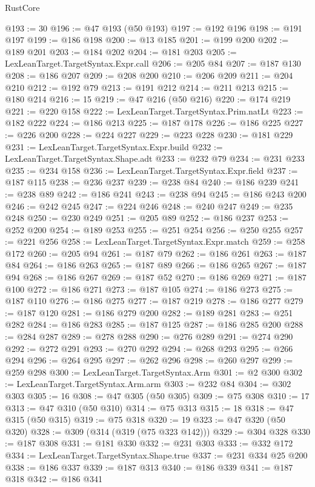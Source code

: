 \begin{lexlean}{RustCore}
\begin{coremodule}
@193 := 30
@196 := @47 @193 (@50 @193)
@197 := @192 @196
@198 := @191 @197
@199 := @186 @198
@200 := @13 @185
@201 := @199 @200
@202 := @189 @201
@203 := @184 @202
@204 := @181 @203
@205 := LexLeanTarget.TargetSyntax.Expr.call
@206 := @205 @84
@207 := @187 @130
@208 := @186 @207
@209 := @208 @200
@210 := @206 @209
@211 := @204 @210
@212 := @192 @79
@213 := @191 @212
@214 := @211 @213
@215 := @180 @214
@216 := 15
@219 := @47 @216 (@50 @216)
@220 := @174 @219
@221 := @220 @158
@222 := LexLeanTarget.TargetSyntax.Prim.natLt
@223 := @182 @222
@224 := @186 @213
@225 := @187 @178
@226 := @186 @225
@227 := @226 @200
@228 := @224 @227
@229 := @223 @228
@230 := @181 @229
@231 := LexLeanTarget.TargetSyntax.Expr.build
@232 := LexLeanTarget.TargetSyntax.Shape.adt
@233 := @232 @79
@234 := @231 @233
@235 := @234 @158
@236 := LexLeanTarget.TargetSyntax.Expr.field
@237 := @187 @115
@238 := @236 @237
@239 := @238 @84
@240 := @186 @239
@241 := @238 @89
@242 := @186 @241
@243 := @238 @94
@245 := @186 @243 @200
@246 := @242 @245
@247 := @224 @246
@248 := @240 @247
@249 := @235 @248
@250 := @230 @249
@251 := @205 @89
@252 := @186 @237
@253 := @252 @200
@254 := @189 @253
@255 := @251 @254
@256 := @250 @255
@257 := @221 @256
@258 := LexLeanTarget.TargetSyntax.Expr.match
@259 := @258 @172
@260 := @205 @94
@261 := @187 @79
@262 := @186 @261
@263 := @187 @84
@264 := @186 @263
@265 := @187 @89
@266 := @186 @265
@267 := @187 @94
@268 := @186 @267
@269 := @187 @52
@270 := @186 @269
@271 := @187 @100
@272 := @186 @271
@273 := @187 @105
@274 := @186 @273
@275 := @187 @110
@276 := @186 @275
@277 := @187 @219
@278 := @186 @277
@279 := @187 @120
@281 := @186 @279 @200
@282 := @189 @281
@283 := @251 @282
@284 := @186 @283
@285 := @187 @125
@287 := @186 @285 @200
@288 := @284 @287
@289 := @278 @288
@290 := @276 @289
@291 := @274 @290
@292 := @272 @291
@293 := @270 @292
@294 := @268 @293
@295 := @266 @294
@296 := @264 @295
@297 := @262 @296
@298 := @260 @297
@299 := @259 @298
@300 := LexLeanTarget.TargetSyntax.Arm
@301 := @2 @300
@302 := LexLeanTarget.TargetSyntax.Arm.arm
@303 := @232 @84
@304 := @302 @303
@305 := 16
@308 := @47 @305 (@50 @305)
@309 := @75 @308
@310 := 17
@313 := @47 @310 (@50 @310)
@314 := @75 @313
@315 := 18
@318 := @47 @315 (@50 @315)
@319 := @75 @318
@320 := 19
@323 := @47 @320 (@50 @320)
@328 := @309 (@314 (@319 (@75 @323 @142)))
@329 := @304 @328
@330 := @187 @308
@331 := @181 @330
@332 := @231 @303
@333 := @332 @172
@334 := LexLeanTarget.TargetSyntax.Shape.true
@337 := @231 @334 @25 @200
@338 := @186 @337
@339 := @187 @313
@340 := @186 @339
@341 := @187 @318
@342 := @186 @341

\end{coremodule}
\end{lexlean}
